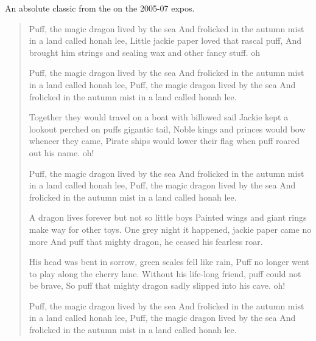An absolute classic from the  on the 2005-07 expos.

\begin{verse}
\begin{centering}
\vspace{3pt}    

\note Puff, the magic dragon lived by the sea 
\newline And frolicked in the autumn mist in a land called honah lee,
\newline Little jackie paper loved that rascal puff,
\newline And brought him strings and sealing wax and other fancy stuff. oh
\par Puff, the magic dragon lived by the sea
\newline And frolicked in the autumn mist in a land called honah lee,
\newline Puff, the magic dragon lived by the sea
\newline And frolicked in the autumn mist in a land called honah lee.
\par Together they would travel on a boat with billowed sail
\newline Jackie kept a lookout perched on puffs gigantic tail,
\newline Noble kings and princes would bow wheneer they came,
\newline Pirate ships would lower their flag when puff roared out his name. oh!
\par Puff, the magic dragon lived by the sea
\newline And frolicked in the autumn mist in a land called honah lee,
\newline Puff, the magic dragon lived by the sea
\newline And frolicked in the autumn mist in a land called honah lee.
\par A dragon lives forever but not so little boys
\newline Painted wings and giant rings make way for other toys.
\newline One grey night it happened, jackie paper came no more
\newline And puff that mighty dragon, he ceased his fearless roar.
\par His head was bent in sorrow, green scales fell like rain,
\newline Puff no longer went to play along the cherry lane.
\newline Without his life-long friend, puff could not be brave,
\newline So puff that mighty dragon sadly slipped into his cave. oh!
\par Puff, the magic dragon lived by the sea
\newline And frolicked in the autumn mist in a land called honah lee,
\newline Puff, the magic dragon lived by the sea
\newline And frolicked in the autumn mist in a land called honah lee. 


\end{centering}
\end{verse}
